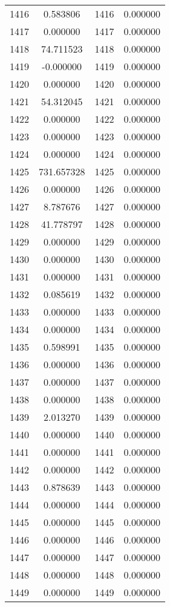 \documentclass[12pt]{article}
\begin{document}
\begin{longtable}{@{}cccc@{}}
1416 & 0.583806 & 1416 & 0.000000 \\
1417 & 0.000000 & 1417 & 0.000000 \\
1418 & 74.711523 & 1418 & 0.000000 \\
1419 & -0.000000 & 1419 & 0.000000 \\
1420 & 0.000000 & 1420 & 0.000000 \\
1421 & 54.312045 & 1421 & 0.000000 \\
1422 & 0.000000 & 1422 & 0.000000 \\
1423 & 0.000000 & 1423 & 0.000000 \\
1424 & 0.000000 & 1424 & 0.000000 \\
1425 & 731.657328 & 1425 & 0.000000 \\
1426 & 0.000000 & 1426 & 0.000000 \\
1427 & 8.787676 & 1427 & 0.000000 \\
1428 & 41.778797 & 1428 & 0.000000 \\
1429 & 0.000000 & 1429 & 0.000000 \\
1430 & 0.000000 & 1430 & 0.000000 \\
1431 & 0.000000 & 1431 & 0.000000 \\
1432 & 0.085619 & 1432 & 0.000000 \\
1433 & 0.000000 & 1433 & 0.000000 \\
1434 & 0.000000 & 1434 & 0.000000 \\
1435 & 0.598991 & 1435 & 0.000000 \\
1436 & 0.000000 & 1436 & 0.000000 \\
1437 & 0.000000 & 1437 & 0.000000 \\
1438 & 0.000000 & 1438 & 0.000000 \\
1439 & 2.013270 & 1439 & 0.000000 \\
1440 & 0.000000 & 1440 & 0.000000 \\
1441 & 0.000000 & 1441 & 0.000000 \\
1442 & 0.000000 & 1442 & 0.000000 \\
1443 & 0.878639 & 1443 & 0.000000 \\
1444 & 0.000000 & 1444 & 0.000000 \\
1445 & 0.000000 & 1445 & 0.000000 \\
1446 & 0.000000 & 1446 & 0.000000 \\
1447 & 0.000000 & 1447 & 0.000000 \\
1448 & 0.000000 & 1448 & 0.000000 \\
1449 & 0.000000 & 1449 & 0.000000 \\

\end{longtable}
\end{document}

